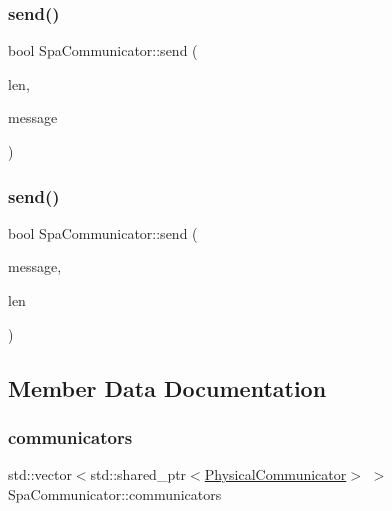 \subsubsection{\texorpdfstring{send()}{send()}\hspace{0.1cm}{\footnotesize\ttfamily [2/3]}}
{\footnotesize\ttfamily bool Spa\+Communicator\+::send (\begin{DoxyParamCaption}\item[{ssize\+\_\+t}]{len,  }\item[{\hyperlink{structSpaMessage}{Spa\+Message} $\ast$}]{message }\end{DoxyParamCaption})}

\mbox{\label{classSpaCommunicator_ab8ad476b9d99685eccca336c2eb4d87c}} 
\subsubsection{\texorpdfstring{send()}{send()}\hspace{0.1cm}{\footnotesize\ttfamily [3/3]}}
{\footnotesize\ttfamily bool Spa\+Communicator\+::send (\begin{DoxyParamCaption}\item[{\hyperlink{structSpaMessage}{Spa\+Message} $\ast$}]{message,  }\item[{ssize\+\_\+t}]{len }\end{DoxyParamCaption})}



\subsection{Member Data Documentation}
\mbox{\label{classSpaCommunicator_acafe7d632d63d55ea081f8a61647243a}} 
\subsubsection{\texorpdfstring{communicators}{communicators}}
{\footnotesize\ttfamily std\+::vector$<$std\+::shared\+\_\+ptr$<$\hyperlink{classPhysicalCommunicator}{Physical\+Communicator}$>$ $>$ Spa\+Communicator\+::communicators\hspace{0.3cm}{\ttfamily [protected]}}

